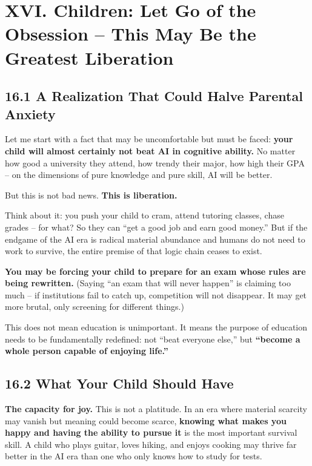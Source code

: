 \documentclass[11pt,a4paper]{article}
\begin{document}
\section{XVI. Children: Let Go of the Obsession -- This May Be the Greatest Liberation}

\subsection{16.1 A Realization That Could Halve Parental Anxiety}

Let me start with a fact that may be uncomfortable but must be faced: \textbf{your child will almost certainly not beat AI in cognitive ability.} No matter how good a university they attend, how trendy their major, how high their GPA -- on the dimensions of pure knowledge and pure skill, AI will be better.

But this is not bad news. \textbf{This is liberation.}

Think about it: you push your child to cram, attend tutoring classes, chase grades -- for what? So they can ``get a good job and earn good money.'' But if the endgame of the AI era is radical material abundance and humans do not need to work to survive, the entire premise of that logic chain ceases to exist.

\textbf{You may be forcing your child to prepare for an exam whose rules are being rewritten.} (Saying ``an exam that will never happen'' is claiming too much -- if institutions fail to catch up, competition will not disappear. It may get more brutal, only screening for different things.)

This does not mean education is unimportant. It means the purpose of education needs to be fundamentally redefined: not ``beat everyone else,'' but \textbf{``become a whole person capable of enjoying life.''}

\subsection{16.2 What Your Child Should Have}

\textbf{The capacity for joy.} This is not a platitude. In an era where material scarcity may vanish but meaning could become scarce, \textbf{knowing what makes you happy and having the ability to pursue it} is the most important survival skill. A child who plays guitar, loves hiking, and enjoys cooking may thrive far better in the AI era than one who only knows how to study for tests.
\end{document}
